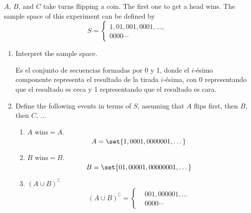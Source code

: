 \item $A$, $B$, and $C$ take turns flipping a coin. The first one to get a head wins. The sample space of this experiment can be defined by
\[ S = \begin{cases}
    1, 01, 001, 0001, \dots,\\
    0000\cdots
\end{cases} \]
\begin{enumerate}
    \item Interpret the sample space.
    
    Es el conjunto de secuencias formadas por 0 y 1, donde el $i$-ésimo componente representa el resultado de la tirada $i$-ésima, con 0 representando que el resultado es ceca y 1 representando que el resultado es cara. 
    
    \item Define the following events in terms of $S$, assuming that $A$ flips first, then $B$, then $C$, $\dots$
    \begin{enumerate}[label={\alph*.}]
        \item $A \text{ wins} = A.$
        \[ A = \set{ 1, 0001, 0000001, \dots } \]
        \item $B \text{ wins} = B.$
        \[ B = \set{ 01, 00001, 00000001, \dots } \]
        \item $(A \cup B)^\complement $
        \[ (A \cup B)^\complement  = \begin{cases}
            &001, 000001, \dots\\
            &0000\cdots
        \end{cases} \]
    \end{enumerate}
\end{enumerate}